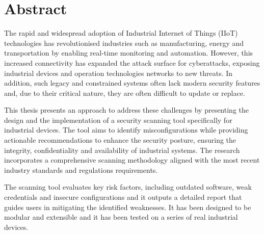 \chapter*{Abstract} %
\label{abtract}


The rapid and widespread adoption of Industrial Internet of Things (IIoT) technologies has revolutionised industries such as manufacturing, energy and transportation by enabling real-time monitoring and automation. However, this increased connectivity has expanded the attack surface for cyberattacks, exposing industrial devices and operation technologies networks to new threats. In addition, such legacy and constrained systems often lack modern security features and, due to their critical nature, they are often difficult to update or replace.

This thesis presents an approach to address these challenges by presenting the design and the implementation of a security scanning tool specifically for industrial devices. The tool aims to identify misconfigurations while providing actionable recommendations to enhance the security posture, ensuring the integrity, confidentiality and availability of industrial systems. The research incorporates a comprehensive scanning methodology aligned with the most recent industry standards and regulations requirements.

The scanning tool evaluates key risk factors, including outdated software, weak credentials and insecure configurations and it outputs a detailed report that guides users in mitigating the identified weaknesses. It has been designed to be modular and extensible and it has been tested on a series of real industrial devices.
